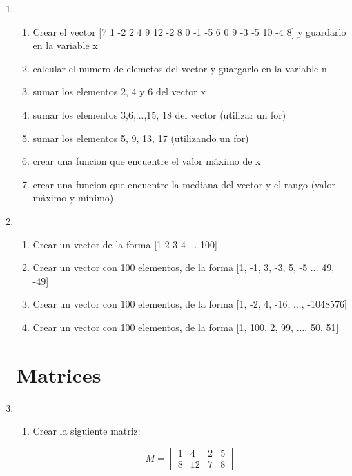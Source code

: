 \documentclass[a4paper, 11pt]{article}
\begin{document}
\begin{enumerate}[font=\large\bfseries]
    \item \\
    \begin{enumerate}
    	\item Crear el vector [7 1  -2 2 4 9 12 -2 8 0 -1 -5 6 0 9 -3 -5 10 -4 8] y guardarlo en la variable x
    	\item calcular el numero de elemetos del vector y guargarlo en la variable n
    	\item sumar los elementos 2, 4 y 6 del vector x
    	\item sumar los elementos 3,6,...,15, 18 del vector (utilizar un for)
    	\item sumar los elementos 5, 9, 13, 17 (utilizando un for)
    	\item crear una funcion que encuentre el valor máximo de x
    	\item crear una funcion que encuentre la mediana del vector y el rango (valor máximo y mínimo)
	\end{enumerate}
	\item
    \begin{enumerate}
        \item Crear un vector de la forma [1 2 3 4 ... 100]
        \item Crear un vector con 100 elementos, de la forma [1, -1, 3, -3, 5, -5 ... 49, -49]
        \item Crear un vector con 100 elementos, de la forma [1, -2, 4, -16, ..., -1048576]
        \item Crear un vector con 100 elementos, de la forma [1, 100, 2, 99, ..., 50, 51]
    \end{enumerate}
    
\section*{Matrices }

    \item
    \begin{enumerate}
        \item Crear la siguiente matriz:
        
                \[
                M=
                  \begin{bmatrix}
                    1 & 4 & 2 & 5 \\
                    8 & 12 & 7 & 8
                  \end{bmatrix}
                \]
    

\end{enumerate}
\end{enumerate}
\end{document}
